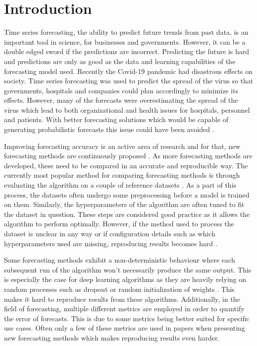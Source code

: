 \chapter{Introduction\label{cha:chapter1}}
Time series forecasting, the ability to predict future trends from past data, is an important tool in science, for businesses and governments. However, it can be a double edged sword if the predictions are incorrect. Predicting the future is hard and predictions are only as good as the data and learning capabilities of the forecasting model used. Recently the Covid-19 pandemic had disastrous effects on society. Time series forecasting was used to predict the spread of the virus so that governments, hospitals and companies could plan accordingly to minimize its effects. However, many of the forecasts were overestimating the spread of the virus which lead to both organizational and health issues for hospitals, personnel and patients. With better forecasting solutions which would be capable of generating probabilistic forecasts this issue could have been avoided \cite{IOANNIDIS2020}.

Improving forecasting accuracy is an active area of research and for that, new forecasting methods are continuously proposed \cite{salinas_deepar_2019,rangapuram_deep_2018,oord_wavenet_2016,oreshkin_n-beats_2020,salinas_high-dimensional_2019}. As more forecasting methods are developed, these need to be compared in an accurate and reproducible way. The currently most popular method for comparing forecasting methods is through evaluating the algorithm on a couple of reference datasets \cite{hyndman_forecasting_3rd}. As a part of this process, the datasets often undergo some preprocessing before a model is trained on them. Similarly, the hyperparameters of the algorithm are often tuned to fit the dataset in question. These steps are considered good practice as it allows the algorithm to perform optimally. However, if the method used to process the dataset is unclear in any way or if configuration details such as which hyperparameters used are missing, reproducing results becomes hard \cite{makridakis_m4_2020}. 

Some forecasting methods exhibit a non-deterministic behaviour where each subsequent run of the algorithm won’t necessarily produce the same output. This is especially the case for deep learning algorithms as they are heavily relying on random processes such as dropout or random initialization of weights \cite{srivastava_dropout_2014}. This makes it hard to reproduce results from these algorithms. Additionally, in the field of forecasting, multiple different metrics are employed in order to quantify the error of forecasts. This is due to some metrics being better suited for specific use cases. Often only a few of these metrics are used in papers when presenting new forecasting methods which makes reproducing results even harder.

